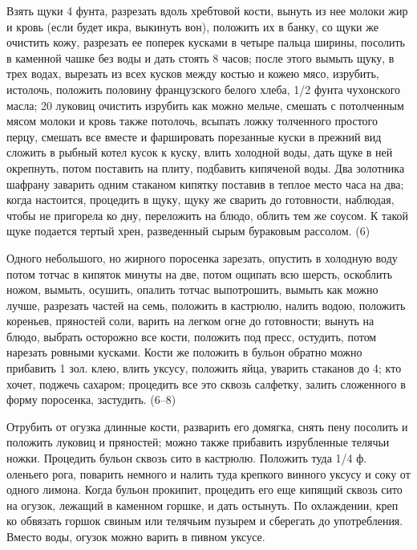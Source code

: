 
Взять щуки 4 фунта, разрезать вдоль хребтовой кости, вынуть из нее молоки жир и кровь (если будет икра, выкинуть вон), положить их в банку, со щуки же очистить кожу, разрезать ее поперек кусками в четыре пальца ширины, посолить в каменной чашке без воды и дать стоять 8 часов; после этого вымыть щуку, в трех водах, вырезать из всех кусков между костью и кожею мясо, изрубить, истолочь, положить половину французского белого хлеба, 1/2 фунта чухонского масла; 20 луковиц очистить изрубить как можно мельче, смешать с потолченным мясом молоки и кровь также потолочь, всыпать ложку толченного простого перцу, смешать все вместе и фаршировать порезанные куски в прежний вид сложить в рыбный котел кусок к куску, влить холодной воды, дать щуке в ней окрепнуть, потом поставить на плиту, подбавить кипяченой воды. Два золотника шафрану заварить одним стаканом кипятку поставив в теплое место часа на два; когда настоится, процедить в щуку, щуку же сварить до готовности, наблюдая, чтобы не пригорела ко дну, переложить на блюдо, облить тем же соусом. К такой щуке подается тертый хрен, разведенный сырым бураковым рассолом. (6) 



Одного небольшого, но жирного поросенка зарезать, опустить в холодную воду потом тотчас в кипяток минуты на две, потом ощипать всю шерсть, оскоблить ножом, вымыть, осушить, опалить тотчас выпотрошить, вымыть как можно лучше, разрезать частей на семь, положить в кастрюлю, налить водою, положить кореньев, пряностей соли, варить на легком огне до готовности; вынуть на блюдо, выбрать осторожно все кости, положить под пресс, остудить, потом нарезать ровными кусками. Кости же положить в бульон обратно можно прибавить 1 зол. клею, влить уксусу, положить яйца, уварить стаканов до 4; кто хочет, поджечь сахаром; процедить все это сквозь салфетку, залить сложенного в форму поросенка, застудить. (6--8) 


Отрубить от огузка длинные кости, разварить его домягка, снять пену посолить и положить луковиц и пряностей; можно также прибавить изрубленные телячьи ножки. Процедить бульон сквозь сито в кастрюлю. Положить туда 1/4 ф. оленьего рога, поварить немного и налить туда крепкого винного уксусу и соку от одного лимона. Когда бульон прокипит, процедить его еще кипящий сквозь сито на огузок, лежащий в каменном горшке, и дать остынуть. По охлаждении, креп ко обвязать горшок свиным или телячьим пузырем и сберегать до употребления. Вместо воды, огузок можно варить в пивном уксусе. 

